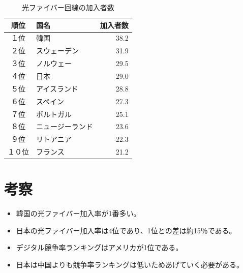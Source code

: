 \documentclass[a4paper,11pt,dvipdfmx]{ujarticle}
\begin{document}
\begin{table}[htbp]
    \centering
    \caption{光ファイバー回線の加入者数}
    \label{tbl:加入者数}

    \begin{tabular}{|c|l|r|}
        \hline
        順位 & 国名 & 加入者数 \\
        \hline
        １位 & 韓国 & 38.2 \\
        \hline
        ２位 & スウェーデン & 31.9 \\
        \hline
        ３位 & ノルウェー & 29.5 \\
        \hline
        ４位 & 日本 & 29.0 \\
        \hline
        ５位 & アイスランド & 28.8 \\
        \hline
        ６位 & スペイン & 27.3 \\
        \hline
        ７位 & ポルトガル & 25.1 \\
        \hline
        ８位 & ニュージーランド & 23.6 \\
        \hline
        ９位 & リトアニア & 22.3 \\
        \hline
        １０位 & フランス & 21.2 \\
        \hline
    \end{tabular}
\end{table}

\section{考察}

\begin{itemize}
    \item 韓国の光ファイバー加入率が1番多い。
    \item 日本の光ファイバー加入率は4位であり、1位との差は約15％である。
    \item デジタル競争率ランキングはアメリカが1位である。
    \item 日本は中国よりも競争率ランキングは低いためあげていく必要がある。
\end{itemize}






%

%


\
\end{document}
